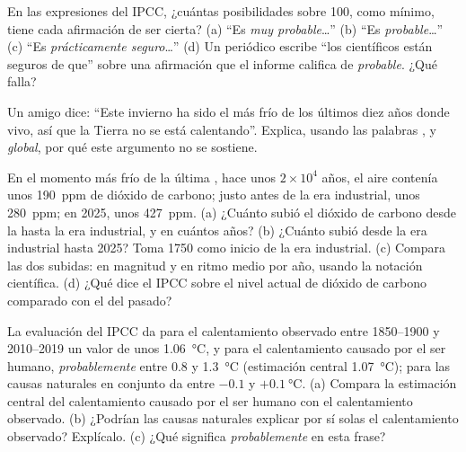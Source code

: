 \begin{exercise}[$\star\star$]\label{exo:g9:climate-past-and-present:9}
En las expresiones del IPCC, ¿cuántas posibilidades sobre 100, como
mínimo, tiene cada afirmación de ser cierta? (a) ``Es \emph{muy
probable}\ldots'' (b) ``Es \emph{probable}\ldots'' (c) ``Es
\emph{prácticamente seguro}\ldots'' (d) Un periódico escribe ``los
científicos están seguros de que'' sobre una afirmación que el informe
califica de \emph{probable}. ¿Qué falla?
\end{exercise}

\begin{exercise}[$\star\star$]\label{exo:g9:climate-past-and-present:10}
Un amigo dice: ``Este invierno ha sido el más frío de los últimos diez
años donde vivo, así que la Tierra no se está calentando''. Explica, usando
las palabras \emph{}, \emph{} y \emph{global}, por qué este
argumento no se sostiene.
\end{exercise}

\begin{exercise}[$\star\star\star$]\label{exo:g9:climate-past-and-present:11}
En el momento más frío de la última , hace unos
$2 \times 10^4$ años, el aire contenía unos \qty{190}{ppm} de dióxido de
carbono; justo antes de la era industrial, unos \qty{280}{ppm}; en 2025,
unos \qty{427}{ppm}. (a) ¿Cuánto subió el dióxido de carbono desde la
 hasta la era industrial, y en cuántos años? (b) ¿Cuánto subió
desde la era industrial hasta 2025? Toma 1750 como inicio de la era
industrial. (c) Compara las dos subidas: en magnitud y en ritmo medio por
año, usando la notación científica. (d) ¿Qué dice el IPCC sobre el nivel
actual de dióxido de carbono comparado con el del pasado?
\end{exercise}

\begin{exercise}[$\star\star\star$]\label{exo:g9:climate-past-and-present:12}
La evaluación del IPCC da para el calentamiento observado entre 1850--1900
y 2010--2019 un valor de unos \qty{1.06}{\degreeCelsius}, y para el
calentamiento causado por el ser humano, \emph{probablemente} entre 0.8 y
\qty{1.3}{\degreeCelsius} (estimación central \qty{1.07}{\degreeCelsius});
para las causas naturales en conjunto da entre
$-0.1$ y $+\qty{0.1}{\degreeCelsius}$. (a) Compara la estimación central
del calentamiento causado por el ser humano con el calentamiento
observado. (b) ¿Podrían las causas naturales explicar por sí solas el
calentamiento observado? Explícalo. (c) ¿Qué significa \emph{probablemente}
en esta frase?
\end{exercise}

